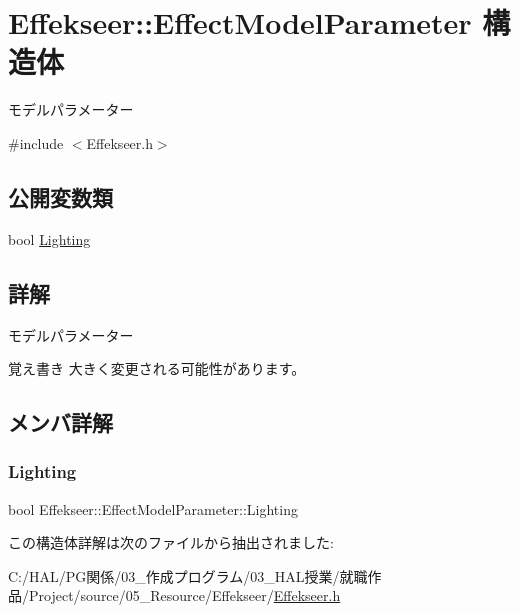\hypertarget{struct_effekseer_1_1_effect_model_parameter}{}\section{Effekseer\+:\+:Effect\+Model\+Parameter 構造体}
\label{struct_effekseer_1_1_effect_model_parameter}


モデルパラメーター  




{\ttfamily \#include $<$Effekseer.\+h$>$}

\subsection*{公開変数類}
\begin{DoxyCompactItemize}
\item 
bool \mbox{\hyperlink{struct_effekseer_1_1_effect_model_parameter_a643065cc16447ee7cccacc4a3279da06}{Lighting}}
\end{DoxyCompactItemize}


\subsection{詳解}
モデルパラメーター 

\begin{DoxyNote}{覚え書き}
大きく変更される可能性があります。 
\end{DoxyNote}


\subsection{メンバ詳解}
\mbox{\label{struct_effekseer_1_1_effect_model_parameter_a643065cc16447ee7cccacc4a3279da06}} 
\subsubsection{\texorpdfstring{Lighting}{Lighting}}
{\footnotesize\ttfamily bool Effekseer\+::\+Effect\+Model\+Parameter\+::\+Lighting}



この構造体詳解は次のファイルから抽出されました\+:\begin{DoxyCompactItemize}
\item 
C\+:/\+H\+A\+L/\+P\+G関係/03\+\_\+作成プログラム/03\+\_\+\+H\+A\+L授業/就職作品/\+Project/source/05\+\_\+\+Resource/\+Effekseer/\mbox{\hyperlink{_effekseer_8h}{Effekseer.\+h}}\end{DoxyCompactItemize}
